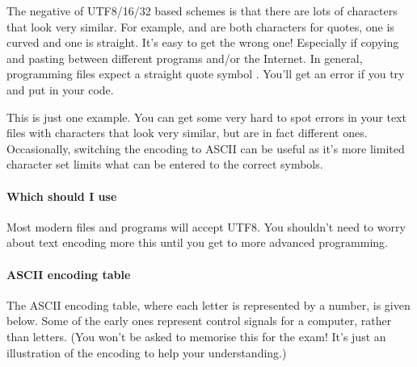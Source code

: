 \documentclass[letterpaper,10pt,british]{sphinxmanual}
\begin{document}
\sphinxAtStartPar
The negative of UTF\sphinxhyphen{}8/16/32 based schemes is that there are lots of characters that look very similar. For example,  and  are both characters for quotes, one is curved and one is straight. It’s easy to get the wrong one! Especially if copying and pasting between different programs and/or the Internet. In general, programming files expect a straight quote symbol . You’ll get an error if you try and put  in your code.

\sphinxAtStartPar
This is just one example. You can get some very hard to spot errors in your text files with characters that look very similar, but are in fact different ones. Occasionally, switching the encoding to ASCII can be useful as it’s more limited character set limits what can be entered to the correct symbols.


\paragraph{Which should I use}
\label{\detokenize{chapters/programming_fundamentals/text_encoding:which-should-i-use}}
\sphinxAtStartPar
Most modern files and programs will accept UTF\sphinxhyphen{}8. You shouldn’t need to worry about text encoding more this until you get to more advanced programming.


\paragraph{ASCII encoding table}
\label{\detokenize{chapters/programming_fundamentals/text_encoding:ascii-encoding-table}}
\sphinxAtStartPar
The ASCII encoding table, where each letter is represented by a number, is given below. Some of the early ones represent control signals for a computer, rather than letters. (You won’t be asked to memorise this for the exam! It’s just an illustration of the encoding to help your understanding.)
\end{document}
